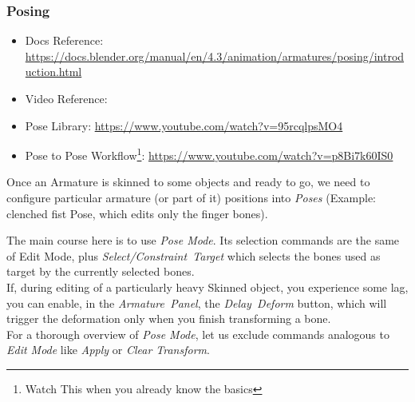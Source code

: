 \documentclass{article}
\begin{document}
\subsubsection{Posing}\label{sec:posing}
\begin{itemize}[topsep=0pt, noitemsep]
    \item Docs Reference: \href{https://docs.blender.org/manual/en/4.3/animation/armatures/posing/introduction.html}{https://docs.blender.org/manual/en/4.3/animation/armatures/posing/introduction.html}
    \item Video Reference: 
    \item Pose Library: \href{https://www.youtube.com/watch?v=95rcqlpsMO4}{https://www.youtube.com/watch?v=95rcqlpsMO4}
    \item Pose to Pose Workflow\footnote{Watch This when you already know the basics}: \href{https://www.youtube.com/watch?v=p8Bi7k60IS0}{https://www.youtube.com/watch?v=p8Bi7k60IS0}
\end{itemize}
Once an Armature is skinned to some objects and ready to go, we need to configure particular armature (or part of it) positions into \textit{Poses} (Example: 
clenched fist Pose, which edits only the finger bones).\par
The main course here is to use \textit{Pose Mode}. Its selection commands are the same of Edit Mode, plus \mbox{\textit{Select/Constraint Target}} which selects the bones used as target by the currently
selected bones.\\
If, during editing of a particularly heavy Skinned object, you experience some lag, you can enable, in the \mbox{\textit{Armature Panel}}, the \mbox{\textit{Delay Deform}} button, which will trigger the 
deformation only when you finish transforming a bone.\\
For a thorough overview of \textit{Pose Mode}, let us exclude commands analogous to \textit{Edit Mode} like \textit{Apply} or \textit{Clear Transform}.
\end{document}
